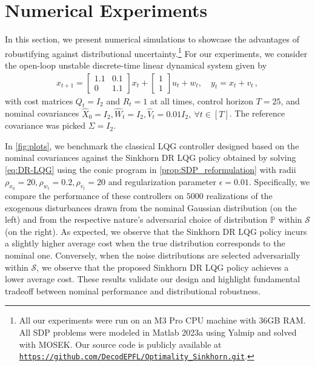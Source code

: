 \documentclass[letterpaper, 10 pt, conference]{ieeeconf}  %
\theoremstyle{ieeeconf}
\newcommand{\Prob}{\mathbb{P}}
\begin{document}
\section{Numerical Experiments}
In this section, we present numerical simulations to showcase the advantages of robustifying against distributional uncertainty.\footnote{All our experiments were run on an M3 Pro CPU machine with 36GB RAM. All SDP problems were modeled in Matlab 2023a using Yalmip and solved with MOSEK.
Our source code is publicly available at \href{https://github.com/DecodEPFL/Optimality_Sinkhorn}{\texttt{https://github.com/DecodEPFL/Optimality\_Sinkhorn.git}}.} For our experiments, we consider the open-loop unstable discrete-time linear dynamical system given by
\begin{align*}
    x_{t+1} = \begin{bmatrix}
        1.1 & 0.1 \\
        0 & 1.1
    \end{bmatrix}x_t + 
    \begin{bmatrix}
        1\\
        1
    \end{bmatrix}
    u_t + w_t, \quad
    y_t = 
    x_t + v_t\,,
\end{align*}
with cost matrices $Q_t = I_2$ and $R_t = 1$ at all times, control horizon $T =25$, and nominal covariances $\hat{X}_0 = I_2, \hat{W}_t = I_2, \hat{V}_t = 0.01I_2, \ \forall t\in[T]$. The reference covariance was picked $\Sigma = I_2$.

In \cref{fig:plots}, we benchmark the classical LQG controller designed based on the nominal covariances against the Sinkhorn DR LQG policy obtained by solving \eqref{eq:DR-LQG} using the conic program in \cref{prop:SDP_reformulation} with radii $\rho_{x_0} = 20,\rho_{w_t} = 0.2, \rho_{v_t} = 20$ and regularization parameter $\epsilon = 0.01$. Specifically, we compare the performance of these controllers on $5000$ realizations of the exogenous disturbances drawn from the nominal Gaussian distribution (on the left) and from the respective nature's adversarial choice of distribution $\Prob$ within $\mathcal{S}$ (on the right). As expected, we observe that the Sinkhorn DR LQG policy incurs a slightly higher average cost when the true distribution corresponds to the nominal one. Conversely, when the noise distributions are selected adversarially within $\mathcal{S}$, we observe that the proposed Sinkhorn DR LQG policy achieves a lower average cost. These results validate our design and highlight fundamental tradeoff between nominal performance and distributional robustness.
\end{document}
